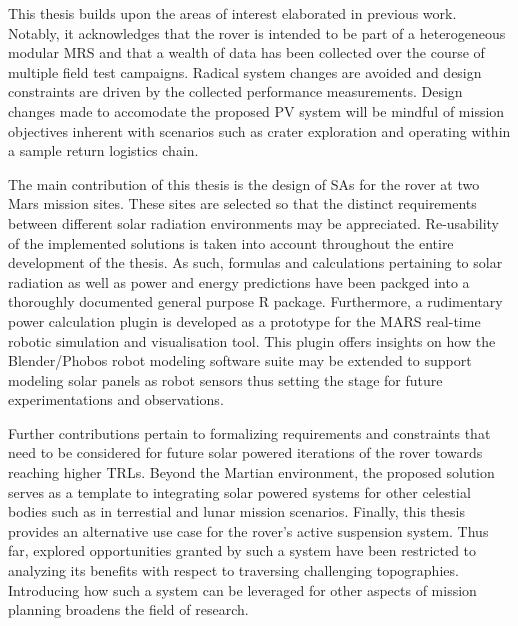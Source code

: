 This thesis builds upon the areas of interest elaborated in previous work. Notably, it acknowledges that the rover is intended to be part of a heterogeneous modular \ac{MRS} and that a wealth of data has been collected over the course of multiple field test campaigns. Radical system changes are avoided and design constraints are driven by the collected performance measurements. Design changes made to accomodate the proposed \ac{PV} system will be mindful of mission objectives inherent with scenarios such as crater exploration and operating within a sample return logistics chain.

The main contribution of this thesis is the design of \acp{SA} for the rover at two Mars mission sites. These sites are selected so that the distinct requirements between different solar radiation environments may be appreciated. Re-usability of the implemented solutions is taken into account throughout the entire development of the thesis. As such, formulas and calculations pertaining to solar radiation as well as power and energy predictions have been packged into a thoroughly documented general purpose R package. Furthermore, a rudimentary power calculation plugin is developed as a prototype for the MARS real-time robotic simulation and visualisation tool. This plugin offers insights on how the Blender/Phobos robot modeling software suite may be extended to support modeling solar panels as robot sensors thus setting the stage for future experimentations and observations.

Further contributions pertain to formalizing requirements and constraints that need to be considered for future solar powered iterations of the rover towards reaching higher \acp{TRL}. Beyond the Martian environment, the proposed solution serves as a template to integrating solar powered systems for other celestial bodies such as in terrestial and lunar mission scenarios. Finally, this thesis provides an alternative use case for the rover's active suspension system. Thus far, explored opportunities granted by such a system have been restricted to analyzing its benefits with respect to traversing challenging topographies. Introducing how such a system can be leveraged for other aspects of mission planning broadens the field of research.

